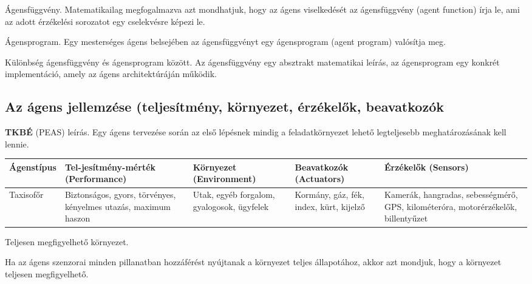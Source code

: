 \begin{definicio}
    Ágensfüggvény.
    Matematikailag megfogalmazva azt mondhatjuk, hogy az ágens viselkedését az
    ágensfüggvény (agent function) írja le, ami az adott érzékelési sorozatot
    egy cselekvésre képezi le.
\end{definicio}

\begin{definicio}
    Ágensprogram.
    Egy mesterséges ágens belsejében az ágensfüggvényt egy ágensprogram (agent
    program) valósítja meg.
\end{definicio}

\begin{megjegyzes}
    Különbség ágensfüggvény és ágensprogram között.
    Az ágensfüggvény egy absztrakt matematikai leírás, az ágensprogram egy
    konkrét implementáció, amely az ágens architektúráján működik.
\end{megjegyzes}

\subsection{Az ágens jellemzése (teljesítmény, környezet, érzékelők, beavatkozók}

\begin{definicio}
    \textbf{TKBÉ} (PEAS) leírás.
    Egy ágens tervezése során az első lépésnek mindig a feladatkörnyezet lehető
    legteljesebb meghatározásának kell lennie.

            \begin{tabularx}{\textwidth}{|X|X|X|X|X|}
            \hline
            \textbf{Ágenstípus} &
            \textbf{Tel-jesítmény-mérték (Performance)} &
            \textbf{Környezet (Environment)} &
            \textbf{Beavatkozók (Actuators)} &
            \textbf{Érzékelők (Sensors)}
            \\\hline
            Taxisofőr &
            Biztonságos, gyors, törvényes, kényelmes utazás, maximum haszon &
            Utak, egyéb forgalom, gyalogosok, ügyfelek &
            Kormány, gáz, fék, index, kürt, kijelző &
            Kamerák, hangradas, sebességmérő, GPS, kilométeróra, motorérzékelők,
            billentyűzet
            \\\hline
        \end{tabularx}
\end{definicio}

\begin{definicio}
    Teljesen megfigyelhető környezet.

    Ha az ágens szenzorai minden pillanatban hozzáférést nyújtanak a környezet
    teljes állapotához, akkor azt mondjuk, hogy a környezet teljesen
    megfigyelhető.
\end{definicio}

